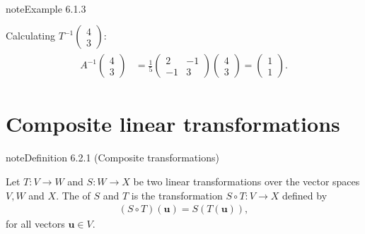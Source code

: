 \documentclass[letterpaper,10pt,english]{jupyterBook}
\begin{document}
\begin{sphinxadmonition}{note}{Example 6.1.3}
\begin{equation*}
\begin{split}
\begin{align*}
\end{align*} \end{split}
\end{equation*}
\sphinxAtStartPar
Calculating \(T^{-1}\begin{pmatrix} 4 \\ 3 \end{pmatrix}\):
\begin{equation*}
\begin{split} \begin{align*}
    A^{-1} \begin{pmatrix} 4 \\ 3 \end{pmatrix} &=
   \frac{1}{5} \begin{pmatrix} 2 & -1 \\ -1 & 3 \end{pmatrix}
    \begin{pmatrix} 4 \\ 3 \end{pmatrix}
    = \begin{pmatrix} 1 \\ 1 \end{pmatrix}.
\end{align*} \end{split}
\end{equation*}\end{sphinxadmonition}

\sphinxstepscope

\ignorespaces 

\section{Composite linear transformations}
\label{\detokenize{_pages/6.2_Composite_transformations:composite-linear-transformations}}\label{\detokenize{_pages/6.2_Composite_transformations:index-0}}\label{\detokenize{_pages/6.2_Composite_transformations:composite-linear-transformations-section}}\label{\detokenize{_pages/6.2_Composite_transformations::doc}}\label{_pages/6.2_Composite_transformations:composite-transformation-definition}
\begin{sphinxadmonition}{note}{Definition 6.2.1 (Composite transformations)}



\sphinxAtStartPar
Let \(T : V \to W\) and \(S: W \to X\) be two linear transformations over the vector spaces \(V, W\) and \(X\). The  of \(S\) and \(T\) is the transformation \(S \circ T: V \to X\) defined by
\begin{equation*}
\begin{split} (S \circ T)(\mathbf{u}) = S(T(\mathbf{u})), \end{split}
\end{equation*}
\sphinxAtStartPar
for all vectors \(\mathbf{u} \in V\).
\end{sphinxadmonition}
\end{document}
